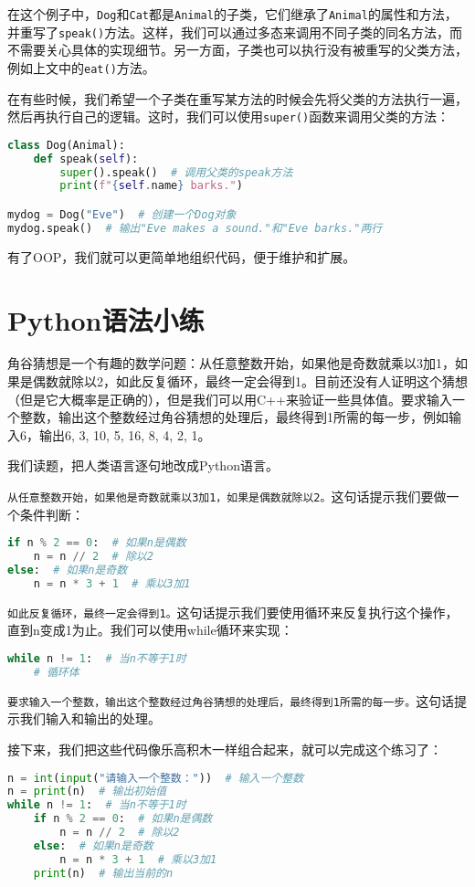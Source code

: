 \documentclass[../main.tex]{subfiles}
\begin{document}
在这个例子中，\texttt{Dog}和\texttt{Cat}都是\texttt{Animal}的子类，它们继承了\texttt{Animal}的属性和方法，并重写了\texttt{speak()}方法。这样，我们可以通过多态来调用不同子类的同名方法，而不需要关心具体的实现细节。另一方面，子类也可以执行没有被重写的父类方法，例如上文中的\texttt{eat()}方法。

在有些时候，我们希望一个子类在重写某方法的时候会先将父类的方法执行一遍，然后再执行自己的逻辑。这时，我们可以使用\texttt{super()}函数来调用父类的方法：
\begin{lstlisting}[language=python]
class Dog(Animal):
    def speak(self):
        super().speak()  # 调用父类的speak方法
        print(f"{self.name} barks.")

mydog = Dog("Eve")  # 创建一个Dog对象
mydog.speak()  # 输出"Eve makes a sound."和"Eve barks."两行
\end{lstlisting}

有了OOP，我们就可以更简单地组织代码，便于维护和扩展。

\section{Python语法小练}

\begin{problem}
    角谷猜想是一个有趣的数学问题：从任意整数开始，如果他是奇数就乘以3加1，如果是偶数就除以2，如此反复循环，最终一定会得到1。目前还没有人证明这个猜想（但是它大概率是正确的），但是我们可以用C++来验证一些具体值。要求输入一个整数，输出这个整数经过角谷猜想的处理后，最终得到1所需的每一步，例如输入6，输出6, 3, 10, 5, 16, 8, 4, 2, 1。
\end{problem}

\begin{solution}
我们读题，把人类语言逐句地改成Python语言。

\texttt{从任意整数开始，如果他是奇数就乘以3加1，如果是偶数就除以2。}这句话提示我们要做一个条件判断：
\begin{lstlisting}[language=python]
if n % 2 == 0:  # 如果n是偶数
    n = n // 2  # 除以2
else:  # 如果n是奇数
    n = n * 3 + 1  # 乘以3加1
\end{lstlisting}
\texttt{如此反复循环，最终一定会得到1。}这句话提示我们要使用循环来反复执行这个操作，直到n变成1为止。我们可以使用while循环来实现：
\begin{lstlisting}[language=python]
while n != 1:  # 当n不等于1时
    # 循环体
\end{lstlisting}

\texttt{要求输入一个整数，输出这个整数经过角谷猜想的处理后，最终得到1所需的每一步。}这句话提示我们输入和输出的处理。

接下来，我们把这些代码像乐高积木一样组合起来，就可以完成这个练习了：
\begin{lstlisting}[language=python]
n = int(input("请输入一个整数："))  # 输入一个整数
n = print(n)  # 输出初始值
while n != 1:  # 当n不等于1时
    if n % 2 == 0:  # 如果n是偶数
        n = n // 2  # 除以2
    else:  # 如果n是奇数
        n = n * 3 + 1  # 乘以3加1
    print(n)  # 输出当前的n
\end{lstlisting}
\end{solution}
\end{document}
